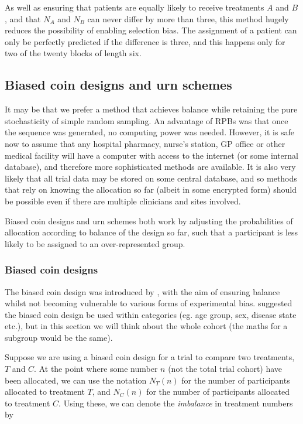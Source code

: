\documentclass[
  openany]{book}
\theoremstyle{definition}
\theoremstyle{definition}
\theoremstyle{definition}
\theoremstyle{definition}
\theoremstyle{remark}
\begin{document}
As well as ensuring that patients are equally likely to receive treatments \(A\) and \(B\), and that \(N_A\) and \(N_B\) can never differ by more than three, this method hugely reduces the possibility of enabling selection bias. The assignment of a patient can only be perfectly predicted if the difference is three, and this happens only for two of the twenty blocks of length six.

\subsection{Biased coin designs and urn schemes}\label{bcurn}

It may be that we prefer a method that achieves balance while retaining the pure stochasticity of simple random sampling. An advantage of RPBs was that once the sequence was generated, no computing power was needed. However, it is safe now to assume that any hospital pharmacy, nurse's station, GP office or other medical facility will have a computer with access to the internet (or some internal database), and therefore more sophisticated methods are available. It is also very likely that all trial data may be stored on some central database, and so methods that rely on knowing the allocation so far (albeit in some encrypted form) should be possible even if there are multiple clinicians and sites involved.

Biased coin designs and urn schemes both work by adjusting the probabilities of allocation according to balance of the design so far, such that a participant is less likely to be assigned to an over-represented group.

\subsubsection{Biased coin designs}\label{biased-coin-designs}

The biased coin design was introduced by \citet{efron1971forcing}, with the aim of ensuring balance whilst not becoming vulnerable to various forms of experimental bias. \citet{efron1971forcing} suggested the biased coin design be used within categories (eg. age group, sex, disease state etc.), but in this section we will think about the whole cohort (the maths for a subgroup would be the same).

Suppose we are using a biased coin design for a trial to compare two treatments, \(T\) and \(C\). At the point where some number \(n\) (not the total trial cohort) have been allocated, we can use the notation \(N_T\left(n\right)\) for the number of participants allocated to treatment \(T\), and \(N_C\left(n\right)\) for the number of participants allocated to treatment \(C\). Using these, we can denote the \emph{imbalance} in treatment numbers by
\end{document}
